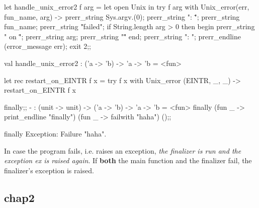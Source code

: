 \begin{enumerate}
  \begin{redcode}
let handle_unix_error2 f arg = let open Unix in 
  try
     f arg
  with Unix_error(err, fun_name, arg) ->
  prerr_string Sys.argv.(0);
  prerr_string ": \"";
  prerr_string fun_name;
  prerr_string "\" failed";
  if String.length arg > 0 then begin
     prerr_string " on \"";
     prerr_string arg;
     prerr_string "\"" end;
     prerr_string ": ";
     prerr_endline (error_message err);
     exit 2;;  
   \end{redcode}
   
   \begin{bluetext}
val handle_unix_error2 : ('a -> 'b) -> 'a -> 'b = <fun>     
\end{bluetext}

\begin{bluetext}
  let rec restart_on_EINTR f x =
  try f x with Unix_error (EINTR, _, _) -> restart_on_EINTR f x  
\end{bluetext}

\begin{alternate}
finally;;
- : (unit -> unit) -> ('a -> 'b) -> 'a -> 'b = <fun>
finally (fun _ -> print_endline "finally") (fun _ -> failwith "haha") ();;
\end{alternate}
\begin{bluecode}
finally
Exception: Failure "haha".
\end{bluecode}

In case the program fails, i.e. raises an exception, \textit{the finalizer is
run and the exception  ex is raised again}. If \textbf{both} the main function
and the finalizer fail, the finalizer's exception is raised.
\end{enumerate}

\subsection{chap2}
\label{sec:chap2}

